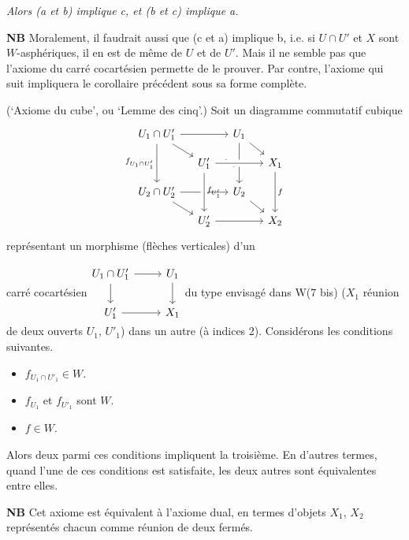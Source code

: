 \documentclass[11pt]{article}
\newcommand{\printedpage}[1]{\marginpar{\footnotesize p.~#1}}
\newcommand{\msp}[1]{\marginpar{\footnotesize [#1]}}
\begin{document}
\textit{Alors (a et b) implique c, et (b et c) implique a.}

\textbf{NB} Moralement, il faudrait aussi que (c et a) implique b, i.e. si $U\cap U'$ et $X$ sont $W$-asphériques, il en est de même de $U$ et de $U'$. Mais il ne semble pas que l'axiome du carré cocartésien permette de le prouver. Par contre, l'axiome qui suit impliquera le corollaire précédent sous sa forme complète.

\printedpage{56}

\begin{description}[leftmargin=5em, style=sameline]
\item[W(7)] (`Axiome du cube', ou `Lemme des cinq'.) Soit un diagramme commutatif cubique
\[
\begin{tikzcd}[row sep=small, column sep=small]
U_1\cap U'_1 \arrow[rr] \arrow[dr] \arrow[dd, "f_{U_1\cap U'_1}"'] & & U_1 \arrow[dr] \arrow[dd, "f_{U_1}"'] & \\
& U'_1 \arrow[rr, crossing over] & & X_1 \arrow[dd, "f"] \\
U_2\cap U'_2 \arrow[rr] \arrow[dr] & & U_2 \arrow[dr] & \\
& U'_2 \arrow[rr] \arrow[from=uu, crossing over, "f_{U'_1}"] & & X_2
\end{tikzcd}
\]
représentant un morphisme (flèches verticales) d'un

\msp{page 77}
carré cocartésien\quad $\vcenter{\hbox{\begin{tikzcd}
U_1\cap U'_1 \arrow[r] \arrow[d] & U_1 \arrow[d] \\
U'_1 \arrow[r] & X_1
\end{tikzcd}}}$\quad du type envisagé dans W(7 bis) ($X_1$ réunion de deux ouverts $U_1$, $U'_1$) dans un autre (à indices 2). Considérons les conditions suivantes.

\begin{itemize}
\item[a)] $f_{U_1\cap U'_1}\in W$.
\item[b)] $f_{U_1}$ et $f_{U'_1}$ sont $W$.
\item[c)] $f\in W$.
\end{itemize}

Alors deux parmi ces conditions impliquent la troisième. En d'autres termes, quand l'une de ces conditions est satisfaite, les deux autres sont équivalentes entre elles.
\end{description}

\textbf{NB} Cet axiome est équivalent à l'axiome dual, en termes d'objets $X_1$, $X_2$ représentés chacun comme réunion de deux fermés.
\end{document}
